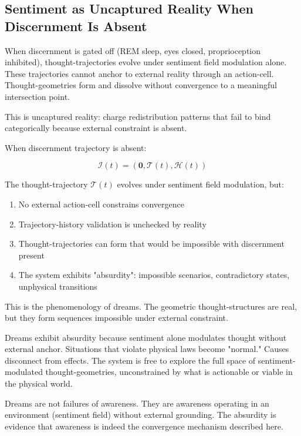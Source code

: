 \subsection{Sentiment as Uncaptured Reality When Discernment Is Absent}

\begin{definition}
\label{def:uncaptured}
When discernment is gated off (REM sleep, eyes closed, proprioception inhibited), thought-trajectories evolve under sentiment field modulation alone. These trajectories cannot anchor to external reality through an action-cell. Thought-geometries form and dissolve without convergence to a meaningful intersection point.

This is uncaptured reality: charge redistribution patterns that fail to bind categorically because external constraint is absent.
\end{definition}

\begin{theorem}
\label{thm:absurdity-mechanism}
When discernment trajectory is absent:

\begin{equation}
\mathcal{I}(t) = (\mathbf{0}, \mathcal{T}(t), \mathcal{H}(t))
\end{equation}

The thought-trajectory $\mathcal{T}(t)$ evolves under sentiment field modulation, but:

\begin{enumerate}[label=(\arabic*),leftmargin=*]
\item No external action-cell constrains convergence
\item Trajectory-history validation is unchecked by reality
\item Thought-trajectories can form that would be impossible with discernment present
\item The system exhibits "absurdity": impossible scenarios, contradictory states, unphysical transitions
\end{enumerate}

This is the phenomenology of dreams. The geometric thought-structures are real, but they form sequences impossible under external constraint.
\end{theorem}

\begin{corollary}
Dreams exhibit absurdity because sentiment alone modulates thought without external anchor. Situations that violate physical laws become "normal." Causes disconnect from effects. The system is free to explore the full space of sentiment-modulated thought-geometries, unconstrained by what is actionable or viable in the physical world.

Dreams are not failures of awareness. They are awareness operating in an environment (sentiment field) without external grounding. The absurdity is evidence that awareness is indeed the convergence mechanism described here.
\end{corollary}

